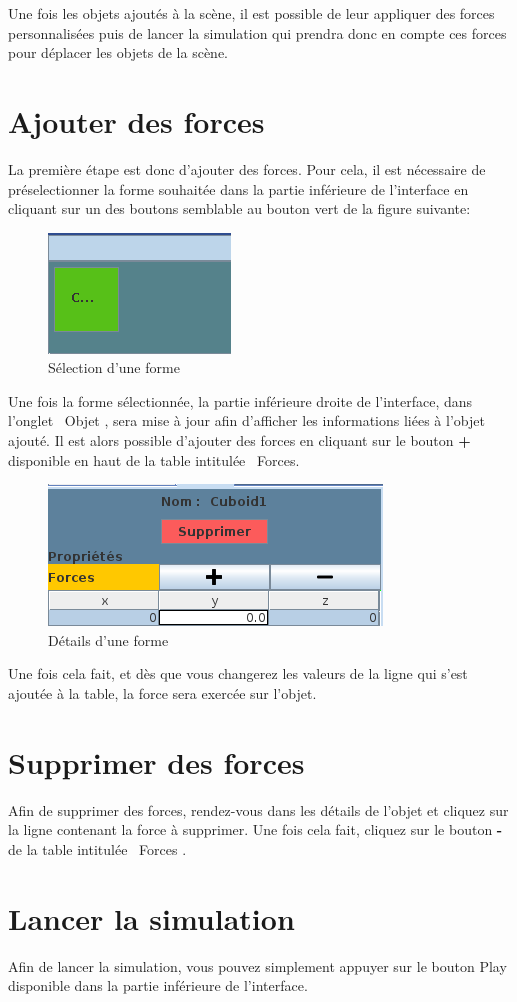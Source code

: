 \documentclass[11pt]{report}
\begin{document}
Une fois les objets ajoutés à la scène, il est possible de leur appliquer des forces personnalisées puis de lancer la simulation qui prendra
donc en compte ces forces pour déplacer les objets de la scène.

\section{Ajouter des forces}

La première étape est donc d'ajouter des forces. Pour cela, il est nécessaire de préselectionner la forme souhaitée dans la partie inférieure
de l'interface en cliquant sur un des boutons semblable au bouton vert de la figure suivante:

\begin{figure}[h]
  \centering
  \includegraphics{./bouton_forme.png}
  \caption{Sélection d'une forme}
\end{figure}

Une fois la forme sélectionnée, la partie inférieure droite de l'interface, dans l'onglet \flqq\ Objet \frqq, sera mise à jour afin d'afficher
les informations liées à l'objet ajouté. Il est alors possible d'ajouter des forces en cliquant sur le bouton \textbf{+} disponible en haut
de la table intitulée \flqq\ Forces\frqq.

\begin{figure}[h]
  \centering
  \includegraphics{./forces.png}
  \caption{Détails d'une forme}
\end{figure}

Une fois cela fait, et dès que vous changerez les valeurs de la ligne qui s'est ajoutée à la table, la force sera exercée sur l'objet.

\section{Supprimer des forces}

Afin de supprimer des forces, rendez-vous dans les détails de l'objet et cliquez sur la ligne contenant la force à supprimer. Une fois cela fait,
cliquez sur le bouton \textbf{-} de la table intitulée \flqq\ Forces \frqq.

\section{Lancer la simulation}

Afin de lancer la simulation, vous pouvez simplement appuyer sur le bouton Play disponible dans la partie inférieure de l'interface.
\end{document}
